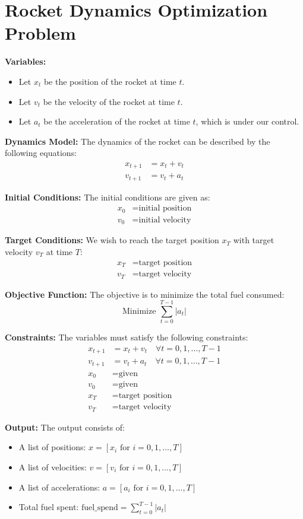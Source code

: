 \documentclass{article}
\begin{document}
\section*{Rocket Dynamics Optimization Problem}

\textbf{Variables:}
\begin{itemize}
    \item Let \( x_t \) be the position of the rocket at time \( t \).
    \item Let \( v_t \) be the velocity of the rocket at time \( t \).
    \item Let \( a_t \) be the acceleration of the rocket at time \( t \), which is under our control.
\end{itemize}

\textbf{Dynamics Model:}
The dynamics of the rocket can be described by the following equations:
\begin{align}
    x_{t+1} &= x_t + v_t \\
    v_{t+1} &= v_t + a_t
\end{align}

\textbf{Initial Conditions:}
The initial conditions are given as:
\begin{align*}
    x_0 &= \text{initial position} \\
    v_0 &= \text{initial velocity}
\end{align*}

\textbf{Target Conditions:}
We wish to reach the target position \( x_T \) with target velocity \( v_T \) at time \( T \):
\begin{align*}
    x_T &= \text{target position} \\
    v_T &= \text{target velocity}
\end{align*}

\textbf{Objective Function:}
The objective is to minimize the total fuel consumed:
\[
\text{Minimize } \sum_{t=0}^{T-1} |a_t|
\]

\textbf{Constraints:}
The variables must satisfy the following constraints:
\begin{align}
    x_{t+1} &= x_t + v_t \quad \forall t = 0, 1, \ldots, T-1 \\
    v_{t+1} &= v_t + a_t \quad \forall t = 0, 1, \ldots, T-1 \\
    x_0 &= \text{given} \\
    v_0 &= \text{given} \\
    x_T &= \text{target position} \\
    v_T &= \text{target velocity}
\end{align}

\textbf{Output:}
The output consists of:
\begin{itemize}
    \item A list of positions: \( x = [x_i \text{ for } i = 0, 1, \ldots, T] \)
    \item A list of velocities: \( v = [v_i \text{ for } i = 0, 1, \ldots, T] \)
    \item A list of accelerations: \( a = [a_i \text{ for } i = 0, 1, \ldots, T] \)
    \item Total fuel spent: \( \text{fuel\_spend} = \sum_{t=0}^{T-1} |a_t| \)
\end{itemize}
\end{document}
